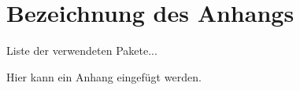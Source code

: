\chapter{Bezeichnung des Anhangs}
\label{ch:packages}

Liste der verwendeten Pakete...

Hier kann ein Anhang eingefügt werden.






